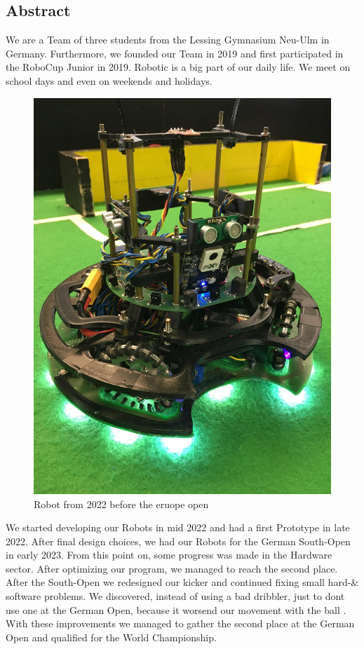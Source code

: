\documentclass{scrartcl}
\begin{document}
\subsection{Abstract}
We are a Team of three students from the Lessing Gymnasium Neu-Ulm in Germany. Furthermore, we founded our Team
in 2019 and first participated in the RoboCup Junior in 2019. Robotic is a big part of our daily life.
We meet on school days and even on weekends and holidays.

\begin{figure}
    \centering
    \includegraphics[width=\textwidth]{img/LWLBot.png}
    \caption{Robot from 2022 before the eruope open}
    \label{fig:LWLBot}
\end{figure}


We started developing our Robots in mid 2022 and had a first Prototype in late 2022. After final design
choices, we had our Robots for the German South-Open in early 2023. From this point on, some progress was
made in the Hardware sector.
After optimizing our program, we managed to reach the second place.
\newline
After the South-Open we redesigned our kicker and continued fixing small hard-\& software problems. We discovered, 
instead of using a bad dribbler, just to dont use one at the German Open, because it worsend our movement with the ball .
With these improvements we managed to gather the second place at the German Open and qualified for the World Championship.
\end{document}
